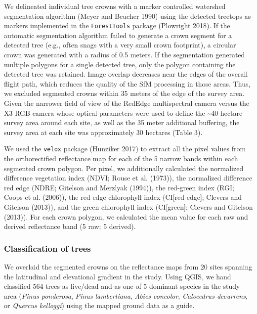 \documentclass[]{article}
\begin{document}
We delineated individual tree crowns with a marker controlled watershed
segmentation algorithm (Meyer and Beucher 1990) using the detected
treetops as markers implemented in the \texttt{ForestTools} package
(Plowright 2018). If the automatic segmentation algorithm failed to
generate a crown segment for a detected tree (e.g., often snags with a
very small crown footprint), a circular crown was generated with a
radius of 0.5 meters. If the segmentation generated multiple polygons
for a single detected tree, only the polygon containing the detected
tree was retained. Image overlap decreases near the edges of the overall
flight path, which reduces the quality of the SfM processing in those
areas. Thus, we excluded segmented crowns within 35 meters of the edge
of the survey area. Given the narrower field of view of the RedEdge
multispectral camera versus the X3 RGB camera whose optical parameters
were used to define the \textasciitilde{}40 hectare survey area around
each site, as well as the 35 meter additional buffering, the survey area
at each site was approximately 30 hectares (Table 3).

We used the \texttt{velox} package (Hunziker 2017) to extract all the
pixel values from the orthorectified reflectance map for each of the 5
narrow bands within each segmented crown polygon. Per pixel, we
additionally calculated the normalized difference vegetation index
(NDVI; Rouse et al. (1973)), the normalized difference red edge (NDRE;
Gitelson and Merzlyak (1994)), the red-green index (RGI; Coops et al.
(2006)), the red edge chlorophyll index (CI{[}red edge{]}; Clevers and
Gitelson (2013)), and the green chlorophyll index (CI{[}green{]};
Clevers and Gitelson (2013)). For each crown polygon, we calculated the
mean value for each raw and derived reflectance band (5 raw; 5 derived).

\subsubsection{Classification of trees}\label{classification-of-trees}

We overlaid the segmented crowns on the reflectance maps from 20 sites
spanning the latitudinal and elevational gradient in the study. Using
QGIS, we hand classified 564 trees as live/dead and as one of 5 dominant
species in the study area (\emph{Pinus ponderosa}, \emph{Pinus
lambertiana}, \emph{Abies concolor}, \emph{Calocedrus decurrens}, or
\emph{Quercus kelloggi}) using the mapped ground data as a guide.
\end{document}
